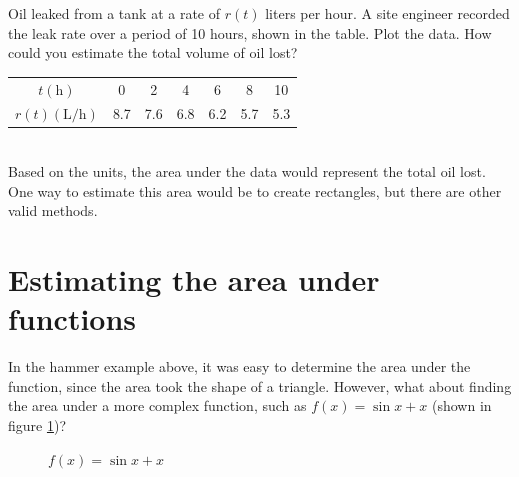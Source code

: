 \begin{Exercise}[label=units3]
	Oil leaked from a tank at a rate of $r(t)$ liters per hour. A site engineer recorded the leak rate over a period of 10 hours, shown in the table. Plot the data. How could you estimate the total volume of oil lost?\\
	\begin{tabular}{c|c|c|c|c|c|c}
		$t(\text{h})$      & 0   & 2   & 4   & 6   & 8   & 10  \\
		$r(t)(\text{L/h})$ & 8.7 & 7.6 & 6.8 & 6.2 & 5.7 & 5.3 \\
	\end{tabular}
\end{Exercise}

\begin{Answer}[ref=units3]
	\\
	Based on the units, the area under the data would represent the total oil lost. One way to estimate this area would be to create rectangles, but there are other valid methods.
\end{Answer}

\section{Estimating the area under functions}

In the hammer example above, it was easy to determine the area under the function, since the area took the shape of a triangle. However, what about finding the area under a more complex function, such as $f(x) = \sin{x}+x$ (shown in figure \ref{fig:riemannsine})?

\begin{figure}[H]
	\centering
	\caption{$f(x) = \sin{x}+x$}
	\label{fig:riemannsine}
\end{figure}

